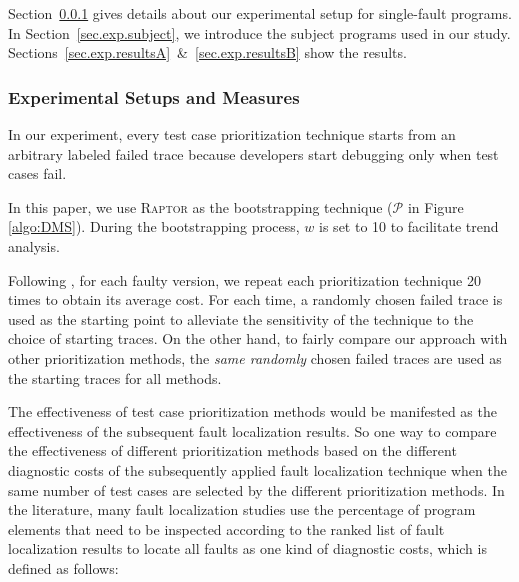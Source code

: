 Section~\ref{sec.exp.setup} gives details about our experimental setup for single-fault programs.
In Section~\ref{sec.exp.subject}, we introduce the subject programs used in our study. Sections~\ref{sec.exp.resultsA}~\&~\ref{sec.exp.resultsB} show the results.

\subsubsection{Experimental Setups and Measures}\label{sec.exp.setup}

In our experiment, every test case prioritization technique starts from
an arbitrary labeled failed trace because developers start debugging only when
test cases fail.

In this paper, we use \textsc{Raptor} as the bootstrapping technique ($\mathcal{P}$ in Figure \ref{algo:DMS}). During the bootstrapping process, $w$ is set to 10 to facilitate trend analysis. 

Following \cite{JiangCT11}, for each faulty version, we repeat each prioritization technique 20 times to obtain its average cost. For each time, a randomly chosen failed trace is used as the starting point to alleviate the sensitivity of the technique to the choice of starting traces. On the other hand, to fairly compare our approach with other prioritization methods, the {\em same randomly} chosen failed traces are used as the starting traces for all methods.

The effectiveness of test case prioritization methods would be manifested as the effectiveness of the subsequent fault localization results. 
So one way to compare the effectiveness of different prioritization methods based on the different diagnostic costs of the subsequently applied fault localization technique when the same number of test cases are selected by the different prioritization methods. In the literature, many fault localization studies use the percentage of program elements that need to be inspected according to the ranked list of fault localization results to locate all faults as one kind of diagnostic costs,
which is defined as follows:

